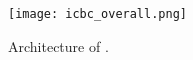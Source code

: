 

\begin{figure}
    \centering
    \texttt{[image: icbc\_overall.png]}
    \caption{Architecture of \sln{}.}
    \label{fig:archi}
\end{figure}




